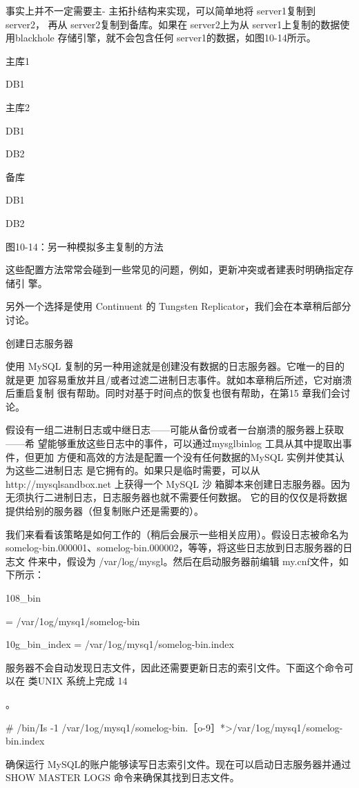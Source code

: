 事实上并不一定需要主- 主拓扑结构来实现，可以简单地将 server1复制到 server2，
再从 server2复制到备库。如果在 server2上为从 server1上复制的数据使用blackhole
存储引擎，就不会包含任何 server1的数据，如图10-14所示。

主库1

DB1

主库2

DB1

DB2

备库

DB1

DB2

图10-14：另一种模拟多主复制的方法

这些配置方法常常会碰到一些常见的问题，例如，更新冲突或者建表时明确指定存储引
擎。

另外一个选择是使用 Continuent 的 Tungsten Replicator，我们会在本章稍后部分讨论。

创建日志服务器

使用 MySQL 复制的另一种用途就是创建没有数据的日志服务器。它唯一的目的就是更
加容易重放并且/或者过滤二进制日志事件。就如本章稍后所述，它对崩溃后重启复制
很有帮助。同时对基于时间点的恢复也很有帮助，在第15 章我们会讨论。

假设有一组二进制日志或中继日志——可能从备份或者一台崩溃的服务器上获取——希
望能够重放这些日志中的事件，可以通过mysglbinlog 工具从其中提取出事件，但更加
方便和高效的方法是配置一个没有任何数据的MySQL 实例并使其认为这些二进制日志
是它拥有的。如果只是临时需要，可以从 http://mysqlsandbox.net 上获得一个 MySQL 沙
箱脚本来创建日志服务器。因为无须执行二进制日志，日志服务器也就不需要任何数据。
它的目的仅仅是将数据提供给别的服务器（但复制账户还是需要的）。

我们来看看该策略是如何工作的（稍后会展示一些相关应用）。假设日志被命名为
somelog-bin.000001、somelog-bin.000002，等等，将这些日志放到日志服务器的日志文
件来中，假设为 /var/log/mysgl。然后在启动服务器前编辑 my.cnf文件，如下所示：

108\_bin

= /var/1og/mysq1/somelog-bin

10g\_bin\_index = /var/1og/mysq1/somelog-bin.index

服务器不会自动发现日志文件，因此还需要更新日志的索引文件。下面这个命令可以在
类UNIX 系统上完成 14

。

# /bin/Is -1 /var/1og/mysq1/somelog-bin.［o-9］*>/var/1og/mysq1/somelog-bin.index

确保运行 MySQL的账户能够读写日志索引文件。现在可以启动日志服务器并通过SHOW
MASTER LOGS 命令来确保其找到日志文件。

